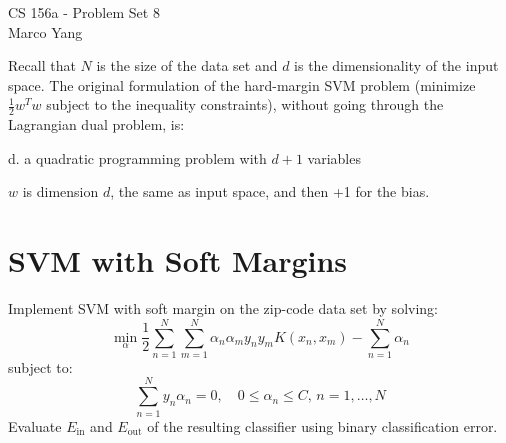 \documentclass[answers]{exam}
\begin{document}
\begin{center}
{\Large CS 156a - Problem Set 8} \\
\medskip
Marco Yang \\
\bigskip
\end{center}

\begin{questions}
\question Recall that \(N\) is the size of the data set and \(d\) is the 
dimensionality of the input space. The original formulation of the hard-margin 
SVM problem (minimize \(\frac{1}{2}w^T w\) subject to the inequality 
constraints), without going through the Lagrangian dual problem, is:

\begin{solution}
d. a quadratic programming problem with \(d+1\) variables

$w$ is dimension $d$, the same as input space, and then +1 for the bias. 
\end{solution}
\end{questions}

\section*{SVM with Soft Margins}

Implement SVM with soft margin on the zip-code data set by solving:
\[
\min_\alpha \frac{1}{2} \sum_{n=1}^N \sum_{m=1}^N 
\alpha_n \alpha_m y_n y_m K(x_n, x_m) - \sum_{n=1}^N \alpha_n
\]
subject to:
\[
\sum_{n=1}^N y_n \alpha_n = 0, \quad 0 \leq \alpha_n \leq C, \, n = 1, \dots, N
\]
Evaluate \(E_{\text{in}}\) and \(E_{\text{out}}\) of the resulting classifier using 
binary classification error.
\end{document}
